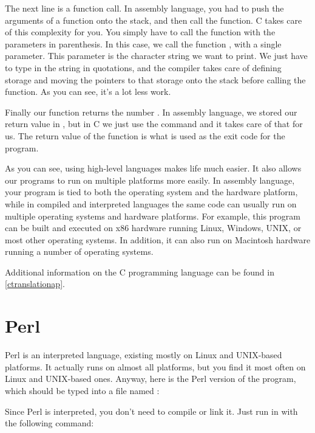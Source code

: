 The next line is a function call.  In assembly language, you had to 
push the arguments of a function onto the stack, and then call the function.
C takes care of this complexity for you.  You simply have to call the
function with the parameters in parenthesis.  In this case, we call
the function , with a single parameter.  This
parameter is the character string we want to print.  We just have to
type in the string in quotations, and the compiler takes care of defining
storage and moving the pointers to that storage onto the stack before
calling the function.  As you can see, it's a lot less work.

Finally our function returns the number .  In assembly
language, we stored our return value in {\eaxReg}, but in C we just use
the  command and it takes care of that for us.
The return value of the  function is what is
used as the exit code for the program.

As you can see, using high-level languages makes life much easier.
It also allows our programs to run on multiple platforms more easily.
In assembly language, your program is tied to both the operating system
and the hardware platform, while in compiled and interpreted languages
the same code can usually run on multiple operating systems and hardware
platforms.  For example, this program can be built and executed on x86
hardware running Linux\textregistered, Windows\textregistered, UNIX\textregistered, or most other operating systems.
In addition, it can also run on Macintosh hardware running a number of
operating systems.

Additional information on the C programming language can be found in
\autoref{ctranslationap}.

\section{Perl}

Perl is an interpreted language, existing mostly on Linux and UNIX-based
platforms.  It actually runs on almost all platforms, but you find it most
often on Linux and UNIX-based ones.  Anyway, here is the Perl version
of the program, which should be typed into a file named 
:

\begin{simpletyping}

\end{simpletyping}

Since Perl is interpreted, you don't need to compile or link it.  Just
run in with the following command:

